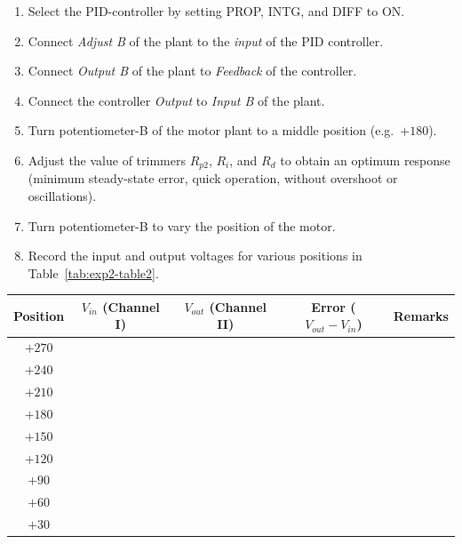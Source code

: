 \begin{procedure}
  \begin{enumerate}
    \item Select the PID-controller by setting PROP, INTG, and DIFF to ON.
    \item Connect \textit{Adjust B} of the plant to the \textit{input} of the PID controller.
    \item Connect \textit{Output B} of the plant to \textit{Feedback} of the controller.
    \item Connect the controller \textit{Output} to \textit{Input B} of the plant.
    \item Turn potentiometer-B of the motor plant to a middle position (e.g.\ $+180$).
    \item Adjust the value of trimmers $R_{p2}$, $R_i$, and $R_d$ to obtain an optimum response (minimum steady-state error, quick operation, without overshoot or oscillations).
    \item Turn potentiometer-B to vary the position of the motor.
    \item Record the input and output voltages for various positions in Table~\ref{tab:exp2-table2}.
  \end{enumerate}

  \needspace{2cm}
  \begin{boxedtable}
    \label{tab:exp2-table2}
    {\renewcommand{\arraystretch}{1.5}%
      \centering
      \begin{tabular}{|c|c|c|c|c|}
        \hline
        Position & $V_{in}$ (Channel I) & $V_{out}$ (Channel II) & Error ($V_{out}-V_{in}$) & Remarks \\
        \hline
        $+270$   &                      &                        &                          &         \\
        \hline
        $+240$   &                      &                        &                          &         \\
        \hline
        $+210$   &                      &                        &                          &         \\
        \hline
        $+180$   &                      &                        &                          &         \\
        \hline
        $+150$   &                      &                        &                          &         \\
        \hline
        $+120$   &                      &                        &                          &         \\
        \hline
        $+90$    &                      &                        &                          &         \\
        \hline
        $+60$    &                      &                        &                          &         \\
        \hline
        $+30$    &                      &                        &                          &         \\
        \hline
      \end{tabular}
    }
  \end{boxedtable}


\end{procedure}
